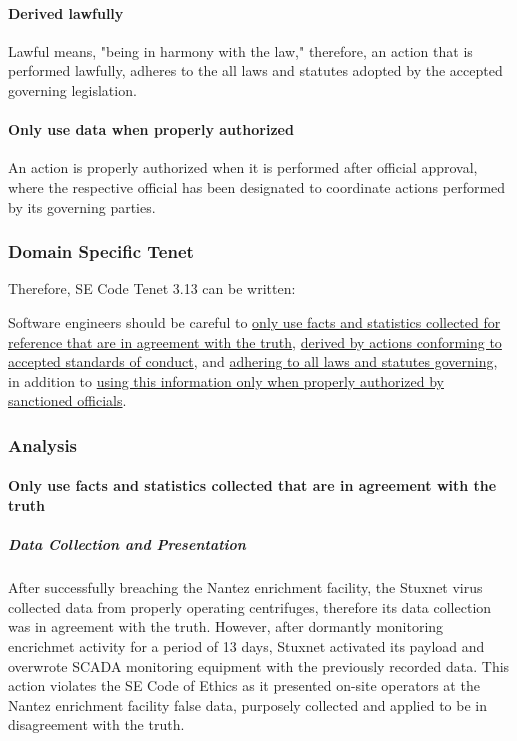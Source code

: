 \documentclass[12pt]{article}
\begin{document}
\begin{multicols}{2}
\paragraph{Derived lawfully}
Lawful means, "being in harmony with the law," therefore, an action that is performed lawfully, adheres to the all laws and statutes adopted by the accepted governing legislation.\cite{lawfulDefinition}

\paragraph{Only use data when properly authorized}
An action is properly authorized when it is performed after official approval, where the respective official has been designated to coordinate actions performed by its governing parties.

\subsubsection{Domain Specific Tenet}

Therefore, SE Code Tenet 3.13 can be written:
\begin{framed}
Software engineers should be careful to \ul{only use facts and statistics collected for reference that are in agreement with the truth}, \ul{derived by actions conforming to accepted standards of conduct}, and \ul{adhering to all laws and statutes governing}, in addition to \ul{using this information only when properly authorized by sanctioned officials}.
\end{framed}

\subsubsection{Analysis}

\paragraph{Only use facts and statistics collected that are in agreement with the truth}

\subparagraph{Data Collection and Presentation}

After successfully breaching the Nantez enrichment facility, the Stuxnet virus collected data from properly operating centrifuges, therefore its data collection was in agreement with the truth. However, after dormantly monitoring encrichmet activity for a period of 13 days, Stuxnet activated its payload and overwrote SCADA monitoring equipment with the previously recorded data. This action violates the SE Code of Ethics as it presented on-site operators at the Nantez enrichment facility false data, purposely collected and applied to be in disagreement with the truth.


\end{multicols}
\end{document}

